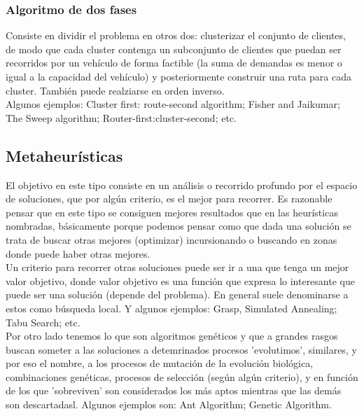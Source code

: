 \documentclass[11pt,a4paper]{article}
\begin{document}
\subsubsection{Algoritmo de dos fases}
Consiste en dividir el problema en otros dos: clusterizar el conjunto de clientes, de modo que cada cluster contenga un subconjunto de clientes que puedan ser recorridos por un vehículo de forma factible (la suma de demandas es menor o igual a la capacidad del vehículo) y posteriormente construir una ruta para cada cluster. También puede realziarse en orden inverso.\\
Algunos ejemplos: Cluster first: route-second algorithm; Fisher and Jaikumar; The Sweep algorithm; Router-first:cluster-second; etc.


\subsection{Metaheurísticas}
El objetivo en este tipo consiste en un análisis o recorrido profundo por el espacio de soluciones, que por algún criterio, es el mejor para recorrer. Es razonable pensar que en este tipo se consiguen mejores resultados que en las heurísticas nombradas, básicamente porque podemos pensar como que dada una solución  se trata de buscar otras mejores (optimizar) incursionando o buscando en zonas donde puede haber otras mejores.\\
Un criterio para recorrer otras soluciones puede ser ir a una que tenga un mejor valor objetivo, donde valor objetivo es una función que expresa lo interesante que puede ser una solución (depende del problema). En general suele denominarse a estos como búsqueda local. Y algunos ejemplos: Grasp,  Simulated Annealing; Tabu Search; etc.
\\
Por otro lado tenemos lo que son algoritmos genéticos y que a grandes rasgos buscan someter a las soluciones a detemrinados procesos 'evolutimos', similares, y por eso el nombre, a los procesos de mutación de la evolución biológica, combinaciones genéticas, procesos de selección (según algún criterio), y en función de los que 'sobreviven' son considerados los más aptos mientras que las demás son descartadasl. Algunos ejemplos son: Ant Algorithm; Genetic Algorithm.
\end{document}
